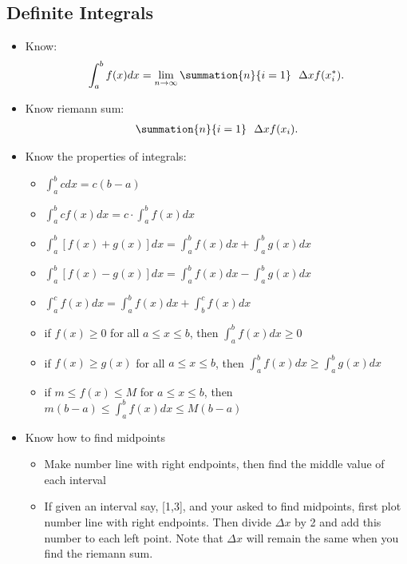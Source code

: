 \documentclass{report}
\begin{document}
     \subsection{Definite Integrals}
      \begin{itemize}
        \item Know: 
          \begin{align*}
            \int_{a}^{b}f(x)dx = \lim\limits_{n \to \infty}{\summation{n}{i=1}\ \ \Delta xf(x_{i}^{*})}
          .\end{align*}
        \item Know riemann sum:
          \begin{align*}
            \summation{n}{i=1}\ \ \Delta xf(x_{i})
          .\end{align*}
        \item Know the properties of integrals:
          \begin{itemize}
            \item $\int_{a}^{b} cdx = c(b-a) $ 
            \item $\int_{a}^{b}cf(x)dx = c \cdot \int_{a}^{b}f(x)dx $
            \item $\int_{a}^{b}[f(x) + g(x)]dx = \int_{a}^{b}f(x)dx + \int_{a}^{b}g(x)dx$
            \item $\int_{a}^{b}[f(x) - g(x)]dx = \int_{a}^{b}f(x)dx - \int_{a}^{b}g(x)dx$
            \item $\int_{a}^{c}f(x)dx = \int_{a}^{b}f(x)dx + \int_{b}^{c}f(x)dx $
            \item if $f(x) \geq 0$ for all $a \leq x \leq b$, then $\int_{a}^{b}f(x)dx \geq  0 $
            \item if $f(x) \geq g(x) $ for all $a \leq x \leq b$, then $\int_{a}^{b}f(x)dx \geq \int_{a}^{b}g(x)dx $
            \item if $m \leq f(x) \leq M $ for $a \leq x \leq b$, then $m(b-a) \leq \int_{a}^{b}f(x)dx \leq M(b-a)$
          \end{itemize}
          \bigbreak \noindent 
        \item Know how to find midpoints
          \begin{itemize}
            \item Make number line with right endpoints, then find the middle value of each interval
            \item If given an interval say, [1,3], and your asked to find midpoints, first plot number line with right endpoints. Then divide $\Delta x$ by 2 and add this number to each left point. Note that $\Delta x$ will remain the same when you find the riemann sum.

\end{itemize}
\end{itemize}
\end{document}

